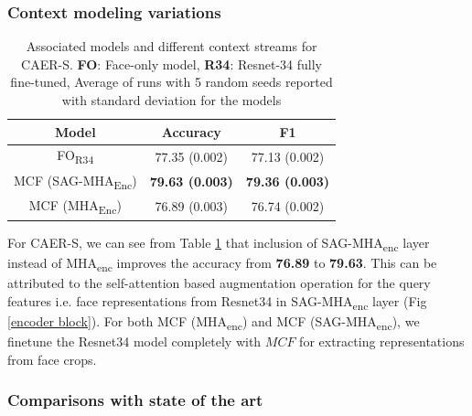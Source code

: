 \subsubsection{Context modeling variations}
\begin{table}[h!]
\centering
\begin{tabular}{|c|c|c|}
\hline
\textbf{Model}  & \textbf{Accuracy} & \textbf{F1}  \\ \hline
FO\textsubscript{R34}          & 77.35 (0.002)     & 77.13 (0.002) \\ \hline
MCF (SAG-MHA\textsubscript{Enc}) & \textbf{79.63 (0.003)}     & \textbf{79.36 (0.003)} \\ \hline
MCF (MHA\textsubscript{Enc})     & 76.89 (0.003)      & 76.74 (0.002) \\ \hline
\end{tabular}
\caption{Associated models and different context streams for CAER-S. \textbf{FO}: Face-only model, \textbf{R34}: Resnet-34 fully fine-tuned, Average of runs with 5 random seeds reported with standard deviation for the models}
\label{ablationCAER-S}
\end{table}

For CAER-S, we can see from Table \ref{ablationCAER-S} that inclusion of SAG-MHA\textsubscript{enc} layer instead of MHA\textsubscript{enc} improves the accuracy from \textbf{76.89} to \textbf{79.63}.  This can be attributed to the self-attention based augmentation operation for the query features i.e. face representations from Resnet34 in SAG-MHA\textsubscript{enc} layer (Fig \ref{encoder block}). For both MCF (MHA\textsubscript{enc}) and MCF (SAG-MHA\textsubscript{enc}), we finetune the Resnet34 model completely with $MCF$ for extracting representations from face crops. 

\subsubsection{Comparisons with state of the art}

